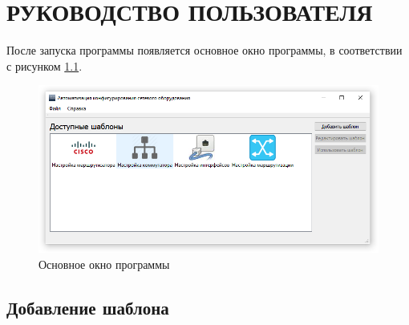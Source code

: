 \chapter{РУКОВОДСТВО ПОЛЬЗОВАТЕЛЯ}

После запуска программы появляется основное окно программы, в соответствии с рисунком \ref{fig:main}. 
%

\begin{figure}[ht!]
\centering
\includegraphics[width=0.8\linewidth]{pic/main}
\caption{Основное окно программы}
\label{fig:main}
\end{figure}

\section{Добавление шаблона}

